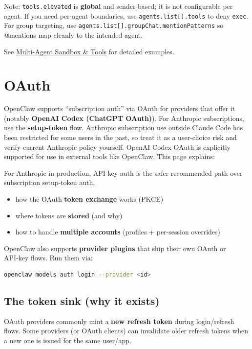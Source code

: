 Note: \texttt{tools.elevated} is \textbf{global} and sender-based; it is not configurable per agent.
If you need per-agent boundaries, use \texttt{agents.list[].tools} to deny \texttt{exec}.
For group targeting, use \texttt{agents.list[].groupChat.mentionPatterns} so @mentions map cleanly to the intended agent.

See \href{/tools/multi-agent-sandbox-tools}{Multi-Agent Sandbox \& Tools} for detailed examples.


\clearpage

\section{OAuth}


OpenClaw supports “subscription auth” via OAuth for providers that offer it (notably \textbf{OpenAI Codex (ChatGPT OAuth)}). For Anthropic subscriptions, use the \textbf{setup-token} flow. Anthropic subscription use outside Claude Code has been restricted for some users in the past, so treat it as a user-choice risk and verify current Anthropic policy yourself. OpenAI Codex OAuth is explicitly supported for use in external tools like OpenClaw. This page explains:

For Anthropic in production, API key auth is the safer recommended path over subscription setup-token auth.

\begin{itemize}
  \item how the OAuth \textbf{token exchange} works (PKCE)
  \item where tokens are \textbf{stored} (and why)
  \item how to handle \textbf{multiple accounts} (profiles + per-session overrides)
\end{itemize}


OpenClaw also supports \textbf{provider plugins} that ship their own OAuth or API‑key
flows. Run them via:

\begin{lstlisting}[language=bash]
openclaw models auth login --provider <id>
\end{lstlisting}


\subsection{The token sink (why it exists)}


OAuth providers commonly mint a \textbf{new refresh token} during login/refresh flows. Some providers (or OAuth clients) can invalidate older refresh tokens when a new one is issued for the same user/app.

